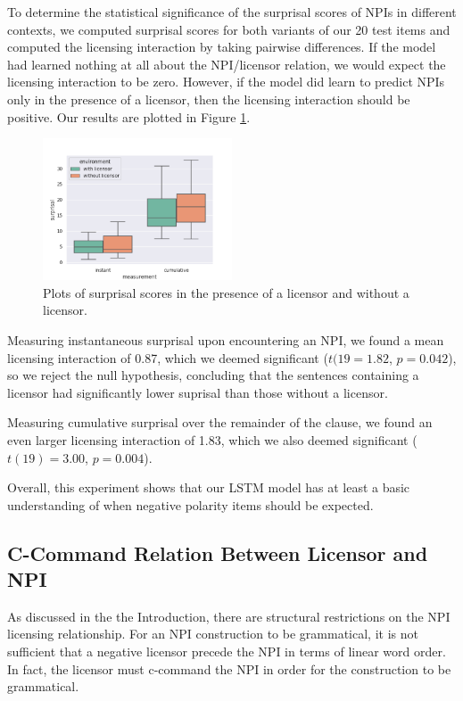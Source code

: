 \documentclass[11pt, round]{article}
\begin{document}
To determine the statistical significance of the surprisal scores of NPIs in different contexts, we computed surprisal scores for both variants of our 20 test items and computed the licensing interaction by taking pairwise differences. If the model had learned nothing at all about the NPI/licensor relation, we would expect the licensing interaction to be zero. However, if the model did learn to predict NPIs only in the presence of a licensor, then the licensing interaction should be positive. Our results are plotted in Figure \ref{fig:basic-detection-box-plot}.

\begin{figure}
    \centering
    \includegraphics[width=0.5\textwidth]{surprisal-c-command-box-plot}
    \caption{Plots of surprisal scores in the presence of a licensor and without a licensor.}
    \label{fig:basic-detection-box-plot}
\end{figure}

Measuring instantaneous surprisal upon encountering an NPI, we found a mean licensing interaction of 0.87, which we deemed significant ($t(19 = 1.82$, $p = 0.042$), so we reject the null hypothesis, concluding that the sentences containing a licensor had significantly lower suprisal than those without a licensor.

Measuring cumulative surprisal over the remainder of the clause, we found an even larger licensing interaction of 1.83, which we also deemed significant ($t(19) = 3.00$, $p = 0.004$).

Overall, this experiment shows that our LSTM model has at least a basic understanding of when negative polarity items should be expected.

\subsection{C-Command Relation Between Licensor and NPI}

As discussed in the the Introduction, there are structural restrictions on the NPI licensing relationship. For an NPI construction to be grammatical, it is not sufficient that a negative licensor precede the NPI in terms of linear word order. In fact, the licensor must c-command the NPI in order for the construction to be grammatical.
\end{document}
